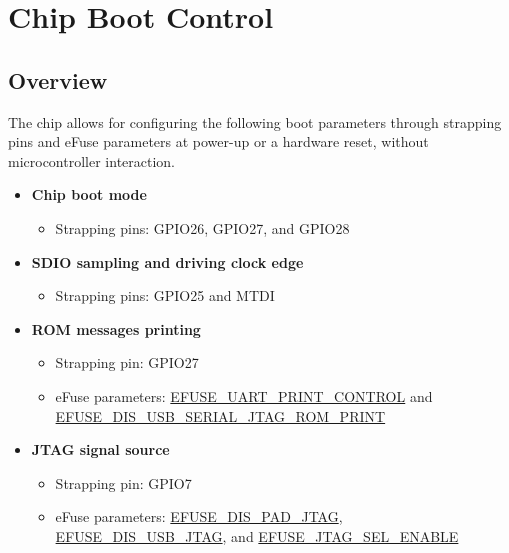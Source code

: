 \documentclass[main\_\_EN.tex]{subfiles}
\begin{document}

\ifglobal
\else
    \listoftodos
    {\let\clearpage\relax \listofdonetodos}
    \tableofcontents
\fi










\hypertarget{bootctrl}{}
\chapter{Chip Boot Control}
\label{mod:bootctrl}


\section{Overview}

The chip allows for configuring the following boot parameters through strapping pins and eFuse parameters at power-up or a hardware reset, without microcontroller interaction.

\begin{itemize}
    \item \textbf{Chip boot mode}
    \begin{itemize}
        \item Strapping pins: GPIO26, GPIO27, and GPIO28
    \end{itemize}
    \item \textbf{SDIO sampling and driving clock edge}
    \begin{itemize}
        \item Strapping pins: GPIO25 and MTDI
    \end{itemize}
    \item \textbf{ROM messages printing}
    \begin{itemize}
        \item Strapping pin: GPIO27
        \item eFuse parameters: \hyperref[fielddesc:EFUSEUARTPRINTCONTROL]{EFUSE\_UART\_PRINT\_CONTROL} and \hyperref[fielddesc:EFUSEDISUSBSERIALJTAGROMPRINT]{EFUSE\_DIS\_USB\_SERIAL\_JTAG\_ROM\_PRINT}
    \end{itemize}
    \item \textbf{JTAG signal source}
    \begin{itemize}
        \item Strapping pin: GPIO7
        \item eFuse parameters: \hyperref[fielddesc:EFUSEDISPADJTAG]{EFUSE\_DIS\_PAD\_JTAG}, \hyperref[fielddesc:EFUSEDISUSBJTAG]{EFUSE\_DIS\_USB\_JTAG}, and \hyperref[fielddesc:EFUSEJTAGSELENABLE]{EFUSE\_JTAG\_SEL\_ENABLE}
    \end{itemize}
\end{itemize}
\end{document}
